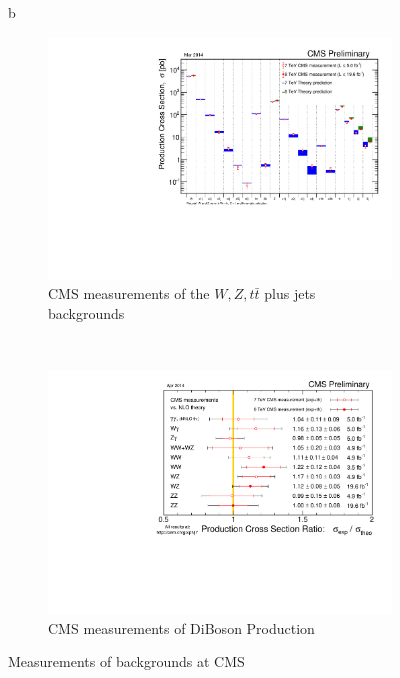 \begin{figure}{b}
    \centering
    \begin{subfigure}[b]{0.45\textwidth}
        \includegraphics[width=\textwidth]{Figures/Experimental_Results/CMS__VJets_TTbar__SigmaNew_v3.pdf}
        \caption{CMS measurements of the $W,Z,t\bar{t}$ plus jets backgrounds}\label{fig:cms_results_VJets_TTJets}
      \end{subfigure}
      ~ %
      \begin{subfigure}[b]{0.45\textwidth}
        \includegraphics[width=\textwidth]{Figures/Experimental_Results/CMS__DibosonResullts__SigmaR_v5.pdf}
        \caption{CMS measurements of DiBoson Production}\label{fig:cms_results_VV}
      \end{subfigure}
      \caption{Measurements of \ttH backgrounds at CMS \cite{ex:CMS_SMP_image}} \label{fig:cms_results_backgrounds}
\end{figure}


